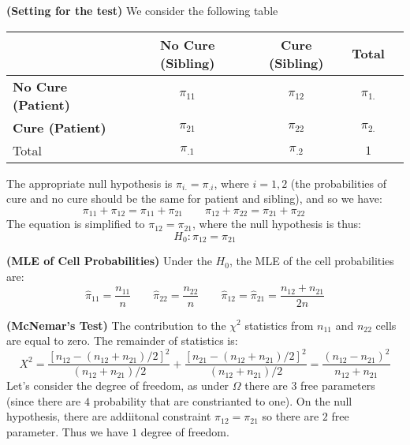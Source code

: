 \begin{remark}{\textbf{(Setting for the test)}}
    We consider the following table 
    \begin{table}[H]
    \centering
    \begin{tabular}{lcccc}
        \toprule
        \textbf{}     & \textbf{No Cure (Sibling)} & \textbf{Cure (Sibling)} & Total  \\
        \midrule
        \textbf{No Cure (Patient)} & $\pi_{11}$ & $\pi_{12}$ & $\pi_{1.}$ \\
        \textbf{Cure (Patient)} & $\pi_{21}$ & $\pi_{22}$ & $\pi_{2.}$ \\
        Total & $\pi_{.1}$ & $\pi_{.2}$ & $1$ \\
        \bottomrule
    \end{tabular}
    \end{table}
    The appropriate null hypothesis is $\pi_{i.} = \pi_{.i}$, where $i = 1,2$ (the probabilities of cure and no cure should be the same for patient and sibling), and so we have:
    \begin{equation*}
        \pi_{11} + \pi_{12} = \pi_{11} + \pi_{21} \qquad 
        \pi_{12} + \pi_{22} = \pi_{21} + \pi_{22} \qquad 
    \end{equation*}
    The equation is simplified to $\pi_{12} = \pi_{21}$, where the null hypothesis is thus:
    \begin{equation*}
        H_0 : \pi_{12} = \pi_{21}
    \end{equation*}
\end{remark}

\begin{proposition}{\textbf{(MLE of Cell Probabilities)}} 
    Under the $H_0$, the MLE of the cell probabilities are:
    \begin{equation*}
        \hat{\pi}_{11} = \frac{n_{11}}{n} \qquad  \hat{\pi}_{22} = \frac{n_{22}}{n} \qquad \hat{\pi}_{12} = \hat{\pi}_{21} = \frac{n_{12} + n_{21}}{2n}
    \end{equation*}
\end{proposition}

\begin{definition}{\textbf{(McNemar's Test)}}
    The contribution to the $\chi^2$ statistics from $n_{11}$ and $n_{22}$ cells are equal to zero. The remainder of statistics is:
    \begin{equation*}
        X^2 =\frac{[n_{12} - (n_{12} + n_{21})/2]^2}{(n_{12} + n_{21})/2} + \frac{[n_{21} - (n_{12} + n_{21})/2]^2}{(n_{12} + n_{21})/2} = \frac{(n_{12} - n_{21})^2}{n_{12} + n_{21}}
    \end{equation*}
    Let's consider the degree of freedom, as under $\Omega$ there are $3$ free parameters (since there are $4$ probability that are constrianted to one). On the null hypothesis, there are addiitonal constraint $\pi_{12} = \pi_{21}$ so there are $2$ free parameter. Thus we have $1$ degree of freedom.
\end{definition}

